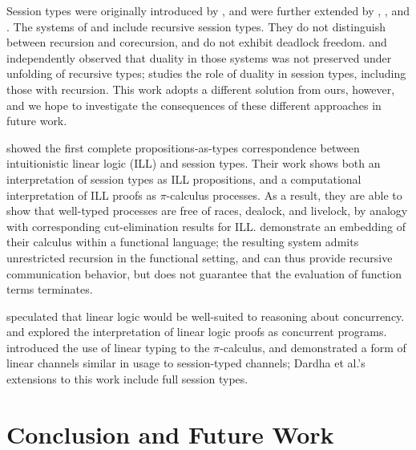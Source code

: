 \documentclass[orivec,envcountsame]{llncs}
\begin{document}
Session types were originally introduced by \citet{Honda93}, and were further extended by
\citet{Takeuchi94}, \citet{Honda98}, and \citet{Yoshida07}. The systems of \citet{Honda98} and
\citet{Yoshida07} include recursive session types. They do not distinguish between recursion and
corecursion, and do not exhibit deadlock freedom. \citet{Bono12} and \citet{Bernardi13}
independently observed that duality in those systems was not preserved under unfolding of recursive
types; \citet{Bernardi14} studies the role of duality in session types, including those with
recursion.  This work adopts a different solution from ours, however, and we hope to investigate the
consequences of these different approaches in future work.

\citet{CairesPfenning10} showed the first complete propositions-as-types correspondence between
intuitionistic linear logic (ILL) and session types. Their work shows both an interpretation of
session types as ILL propositions, and a computational interpretation of ILL proofs as
$\pi$-calculus processes. As a result, they are able to show that well-typed processes are free of
races, dealock, and livelock, by analogy with corresponding cut-elimination results for
ILL. \citet{Toninho13} demonstrate an embedding of their calculus within a functional language; the
resulting system admits unrestricted recursion in the functional setting, and can thus provide
recursive communication behavior, but does not guarantee that the evaluation of function terms
terminates.

\citet{Girard87} speculated that linear logic would be well-suited to reasoning about concurrency.
\citet{Abramsky92} and \citet{BellinScott94} explored the interpretation of linear logic proofs as
concurrent programs. \citet{Kobayashi96} introduced the use of linear typing to the $\pi$-calculus,
and demonstrated a form of linear channels similar in usage to session-typed channels; Dardha et
al.'s~\citeyearpar{Dardha12} extensions to this work include full session types.

\section{Conclusion and Future Work}\label{sec:future}
\end{document}

